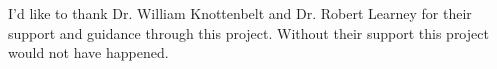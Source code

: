 \abstract

\thispagestyle{plain}
\setcounter{page}{2}

I'd like to thank Dr. William Knottenbelt and Dr. Robert Learney for their support and guidance through this project. Without their support this project would not have happened.
